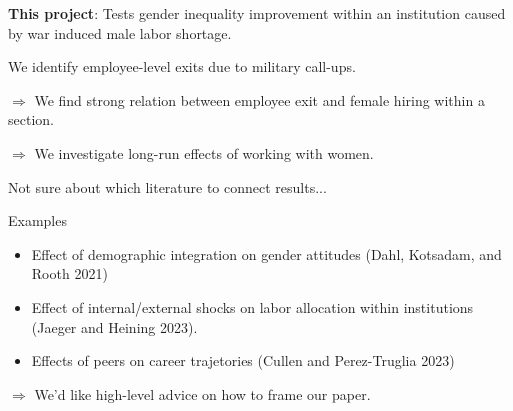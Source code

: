 \begin{transitionframe}
    \begin{wideitemize}
        \item \textbf{This project}: Tests gender inequality improvement within an institution caused by war induced male labor shortage.

        \pause
        \item We identify employee-level exits due to military call-ups.

        $\Rightarrow$ We find strong relation between employee exit and female hiring within a section.
        
        $\Rightarrow$ We investigate long-run effects of working with women.

        \pause
        \item Not sure about which literature to connect results...

        Examples
        \begin{itemize}
            \item Effect of demographic integration on gender attitudes (\color{gray}Dahl, Kotsadam, and Rooth 2021\color{black})
            \item Effect of internal/external shocks on labor allocation within institutions (\color{gray}Jaeger and Heining 2023\color{black}).
            \item Effects of peers on career trajetories (\color{gray}Cullen and Perez-Truglia 2023\color{black})
        \end{itemize}

        $\Rightarrow$ We'd like high-level advice on how to frame our paper.
    \end{wideitemize}
\end{transitionframe}